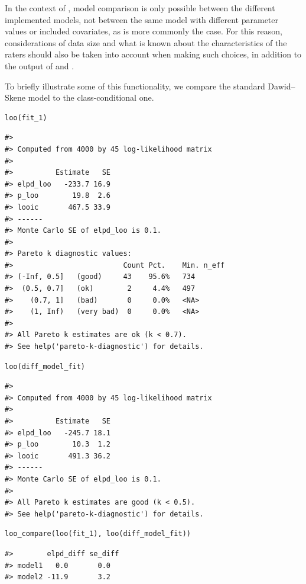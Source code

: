 In the context of , model comparison is only possible between
the different implemented models, not between the same model with different
parameter values or included covariates, as is more commonly the case. For
this reason, considerations of data size and what is known about the
characteristics of the raters should also be taken into account when making
such choices, in addition to the output of  and .

To briefly illustrate some of this functionality, we compare the standard
Dawid--Skene model to the class-conditional one.

\begin{verbatim}
loo(fit_1)
\end{verbatim}

\begin{verbatim}
#> 
#> Computed from 4000 by 45 log-likelihood matrix
#> 
#>          Estimate   SE
#> elpd_loo   -233.7 16.9
#> p_loo        19.8  2.6
#> looic       467.5 33.9
#> ------
#> Monte Carlo SE of elpd_loo is 0.1.
#> 
#> Pareto k diagnostic values:
#>                          Count Pct.    Min. n_eff
#> (-Inf, 0.5]   (good)     43    95.6%   734       
#>  (0.5, 0.7]   (ok)        2     4.4%   497       
#>    (0.7, 1]   (bad)       0     0.0%   <NA>      
#>    (1, Inf)   (very bad)  0     0.0%   <NA>      
#> 
#> All Pareto k estimates are ok (k < 0.7).
#> See help('pareto-k-diagnostic') for details.
\end{verbatim}

\begin{verbatim}
loo(diff_model_fit)
\end{verbatim}

\begin{verbatim}
#> 
#> Computed from 4000 by 45 log-likelihood matrix
#> 
#>          Estimate   SE
#> elpd_loo   -245.7 18.1
#> p_loo        10.3  1.2
#> looic       491.3 36.2
#> ------
#> Monte Carlo SE of elpd_loo is 0.1.
#> 
#> All Pareto k estimates are good (k < 0.5).
#> See help('pareto-k-diagnostic') for details.
\end{verbatim}

\begin{verbatim}
loo_compare(loo(fit_1), loo(diff_model_fit))
\end{verbatim}

\begin{verbatim}
#>        elpd_diff se_diff
#> model1   0.0       0.0  
#> model2 -11.9       3.2
\end{verbatim}

